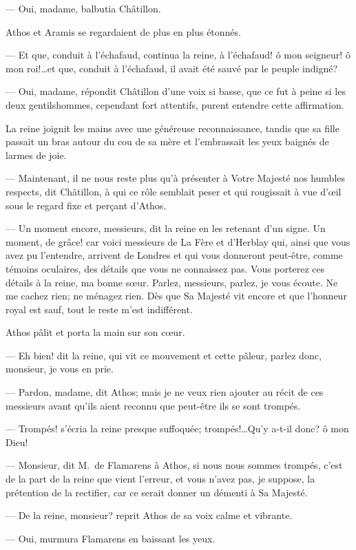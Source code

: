 — Oui, madame, balbutia Châtillon.

Athos et Aramis se regardaient de plus en plus étonnés.

— Et que, conduit à l'échafaud, continua la reine, à l'échafaud! ô mon seigneur! ô mon roi!\dots et que, conduit à l'échafaud, il avait été sauvé par le peuple indigné?

— Oui, madame, répondit Châtillon d'une voix si basse, que ce fut à peine si les deux gentilshommes, cependant fort attentifs, purent entendre cette affirmation.

La reine joignit les mains avec une généreuse reconnaissance, tandis que sa fille passait un bras autour du cou de sa mère et l'embrassait les yeux baignés de larmes de joie.

— Maintenant, il ne nous reste plus qu'à présenter à Votre Majesté nos humbles respects, dit Châtillon, à qui ce rôle semblait peser et qui rougissait à vue d'œil sous le regard fixe et perçant d'Athos.

— Un moment encore, messieurs, dit la reine en les retenant d'un signe. Un moment, de grâce! car voici messieurs de La Fère et d'Herblay qui, ainsi que vous avez pu l'entendre, arrivent de Londres et qui vous donneront peut-être, comme témoins oculaires, des détails que vous ne connaissez pas. Vous porterez ces détails à la reine, ma bonne sœur. Parlez, messieurs, parlez, je vous écoute. Ne me cachez rien; ne ménagez rien. Dès que Sa Majesté vit encore et que l'honneur royal est sauf, tout le reste m'est indifférent.

Athos pâlit et porta la main sur son cœur.

— Eh bien! dit la reine, qui vit ce mouvement et cette pâleur, parlez donc, monsieur, je vous en prie.

— Pardon, madame, dit Athos; mais je ne veux rien ajouter au récit de ces messieurs avant qu'ils aient reconnu que peut-être ils se sont trompés.

— Trompés! s'écria la reine presque suffoquée; trompés!\dots Qu'y a-t-il donc? ô mon Dieu!

— Monsieur, dit M.~de Flamarens à Athos, si nous nous sommes trompés, c'est de la part de la reine que vient l'erreur, et vous n'avez pas, je suppose, la prétention de la rectifier, car ce serait donner un démenti à Sa Majesté.

— De la reine, monsieur? reprit Athos de sa voix calme et vibrante.

— Oui, murmura Flamarens en baissant les yeux.

